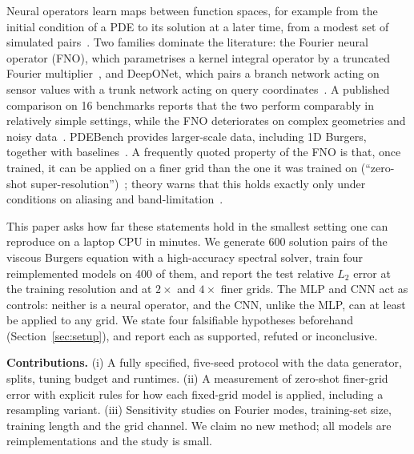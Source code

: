 Neural operators learn maps between function spaces, for example from the initial condition of a PDE to its solution at a later time, from a modest set of simulated pairs~\cite{kovachki2021neural}. Two families dominate the literature: the Fourier neural operator (FNO), which parametrises a kernel integral operator by a truncated Fourier multiplier~\cite{li2020fourier}, and DeepONet, which pairs a branch network acting on sensor values with a trunk network acting on query coordinates~\cite{lu2019deeponet}. A published comparison on 16 benchmarks reports that the two perform comparably in relatively simple settings, while the FNO deteriorates on complex geometries and noisy data~\cite{lu2021comprehensive}. PDEBench provides larger-scale data, including 1D Burgers, together with baselines~\cite{takamoto2022pdebench}. A frequently quoted property of the FNO is that, once trained, it can be applied on a finer grid than the one it was trained on (``zero-shot super-resolution'')~\cite{li2020fourier}; theory warns that this holds exactly only under conditions on aliasing and band-limitation~\cite{bartolucci2023representation}.

This paper asks how far these statements hold in the smallest setting one can reproduce on a laptop CPU in minutes. We generate 600 solution pairs of the viscous Burgers equation with a high-accuracy spectral solver, train four reimplemented models on 400 of them, and report the test relative $L_2$ error at the training resolution and at $2\times$ and $4\times$ finer grids. The MLP and CNN act as controls: neither is a neural operator, and the CNN, unlike the MLP, can at least be applied to any grid. We state four falsifiable hypotheses beforehand (Section~\ref{sec:setup}), and report each as supported, refuted or inconclusive.

\textbf{Contributions.} (i) A fully specified, five-seed protocol with the data generator, splits, tuning budget and runtimes. (ii) A measurement of zero-shot finer-grid error with explicit rules for how each fixed-grid model is applied, including a resampling variant. (iii) Sensitivity studies on Fourier modes, training-set size, training length and the grid channel. We claim no new method; all models are reimplementations and the study is small.
